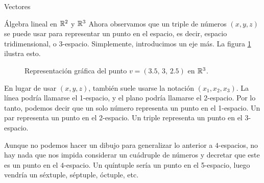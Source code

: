 \begin{chapter}{Vectores}
\begin{section}{\'Algebra lineal en $\mathbb R^2$ y $\mathbb R^3$}
        Ahora observamos que un triple de números $(x, y, z)$ se puede usar para representar un punto en el espacio, es decir, espacio tridimensional, o 3-espacio. Simplemente, introducimos un eje más. La figura \ref{fig-punto-en-R3} ilustra esto.
        \begin{figure}[h]
        	\centering
            \caption{Representación gráfica del punto $v = (3.5,\,3,\,2.5)$ en $\mathbb R^3$. }
            \label{fig-punto-en-R3}
        \end{figure}			
        
        En lugar de usar $(x,y,z)$, también suele usarse la notación $(x_1,x_2,x_3)$. La línea podría llamarse el 1-espacio, y el plano podría llamarse el 2-espacio. Por lo tanto, podemos decir que un solo número representa un punto en el 1-espacio. Un par representa un punto en el 2-espacio. Un triple representa un punto en el 3-espacio.
        
        Aunque no podemos hacer un dibujo para generalizar lo anterior a $4$-espacios, no hay nada que nos impida considerar un cuádruple de números y decretar que este es un punto en el $4$-espacio. Un quíntuple sería un punto en el 5-espacio, luego vendría un séxtuple, séptuple, óctuple, etc.
        

\end{section}
\end{chapter}
